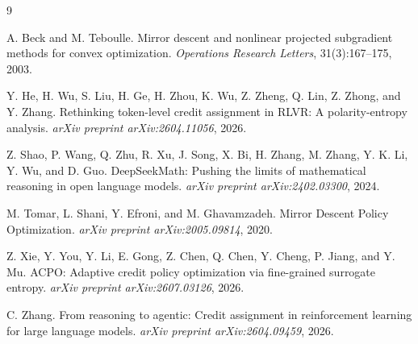 \documentclass[10pt]{article}
\begin{document}
\begin{thebibliography}{9}

A. Beck and M. Teboulle.
Mirror descent and nonlinear projected subgradient methods for convex
optimization.
\emph{Operations Research Letters}, 31(3):167--175, 2003.

Y. He, H. Wu, S. Liu, H. Ge, H. Zhou, K. Wu, Z. Zheng, Q. Lin, Z. Zhong,
and Y. Zhang.
Rethinking token-level credit assignment in RLVR: A polarity-entropy analysis.
\emph{arXiv preprint arXiv:2604.11056}, 2026.

Z. Shao, P. Wang, Q. Zhu, R. Xu, J. Song, X. Bi, H. Zhang, M. Zhang,
Y. K. Li, Y. Wu, and D. Guo.
DeepSeekMath: Pushing the limits of mathematical reasoning in open language
models.
\emph{arXiv preprint arXiv:2402.03300}, 2024.

M. Tomar, L. Shani, Y. Efroni, and M. Ghavamzadeh.
Mirror Descent Policy Optimization.
\emph{arXiv preprint arXiv:2005.09814}, 2020.

Z. Xie, Y. You, Y. Li, E. Gong, Z. Chen, Q. Chen, Y. Cheng, P. Jiang,
and Y. Mu.
ACPO: Adaptive credit policy optimization via fine-grained surrogate entropy.
\emph{arXiv preprint arXiv:2607.03126}, 2026.

C. Zhang.
From reasoning to agentic: Credit assignment in reinforcement learning for
large language models.
\emph{arXiv preprint arXiv:2604.09459}, 2026.

\end{thebibliography}
\end{document}
